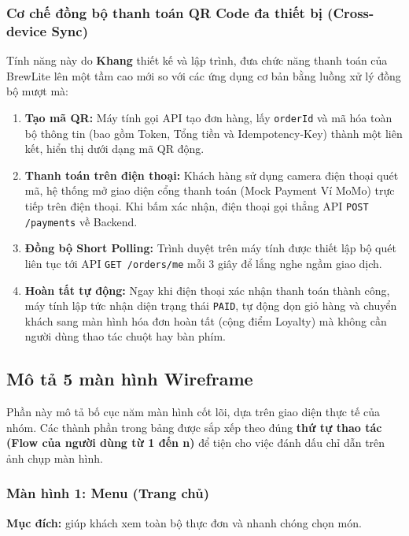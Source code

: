\subsubsection{Cơ chế đồng bộ thanh toán QR Code đa thiết bị (Cross-device Sync)}
Tính năng này do \textbf{Khang} thiết kế và lập trình, đưa chức năng thanh toán của BrewLite lên một tầm cao mới so với các ứng dụng cơ bản bằng luồng xử lý đồng bộ mượt mà:
\begin{enumerate}
    \item \textbf{Tạo mã QR:} Máy tính gọi API tạo đơn hàng, lấy \texttt{orderId} và mã hóa toàn bộ thông tin (bao gồm Token, Tổng tiền và Idempotency-Key) thành một liên kết, hiển thị dưới dạng mã QR động.
    \item \textbf{Thanh toán trên điện thoại:} Khách hàng sử dụng camera điện thoại quét mã, hệ thống mở giao diện cổng thanh toán (Mock Payment Ví MoMo) trực tiếp trên điện thoại. Khi bấm xác nhận, điện thoại gọi thẳng API \texttt{POST /payments} về Backend.
    \item \textbf{Đồng bộ Short Polling:} Trình duyệt trên máy tính được thiết lập bộ quét liên tục tới API \texttt{GET /orders/me} mỗi 3 giây để lắng nghe ngầm giao dịch.
    \item \textbf{Hoàn tất tự động:} Ngay khi điện thoại xác nhận thanh toán thành công, máy tính lập tức nhận diện trạng thái \texttt{PAID}, tự động dọn giỏ hàng và chuyển khách sang màn hình hóa đơn hoàn tất (cộng điểm Loyalty) mà không cần người dùng thao tác chuột hay bàn phím.
\end{enumerate}
\subsection{Mô tả 5 màn hình Wireframe}
\label{sec:wireframe}

Phần này mô tả bố cục năm màn hình cốt lõi, dựa trên giao diện thực tế của nhóm. Các thành phần trong bảng được sắp xếp theo đúng \textbf{thứ tự thao tác (Flow của người dùng từ 1 đến n)} để tiện cho việc đánh dấu chỉ dẫn trên ảnh chụp màn hình.

\subsubsection{Màn hình 1: Menu (Trang chủ)}
\label{subsec:wf-menu}
\textbf{Mục đích:} giúp khách xem toàn bộ thực đơn và nhanh chóng chọn món.

